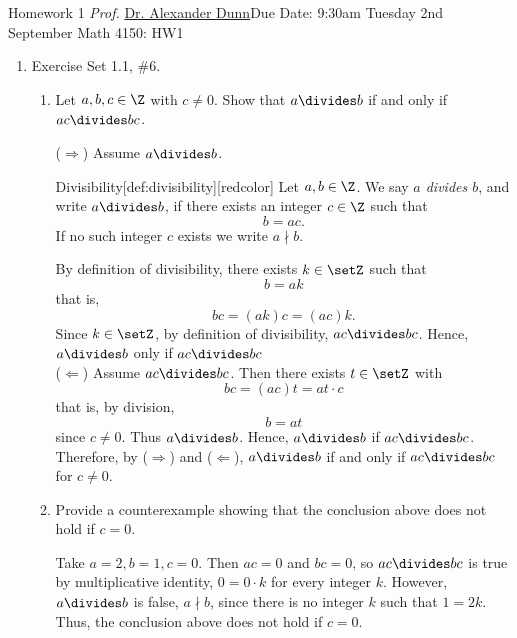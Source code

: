 
\newpage{}
{Homework 1}
{\textit{Prof.} \href{https://alexjdunn.weebly.com/}{Dr. Alexander Dunn}}{Due Date: 9:30am Tuesday 2nd September}
{Math 4150: HW1}


\newpage


\begin{enumerate}
  \item Exercise Set 1.1, \#6.
  \begin{enumerate}
    \item Let $a,b, c\in \Z$ with $c\neq 0$. Show that $a\divides b$ if and only if $ac \divides bc$.
    \begin{subprove}
      ($\Rightarrow$) Assume $a\divides b$. 
      \begin{define}{Divisibility}[def:divisibility][redcolor]
      Let $a,b\in\Z$. We say \emph{$a$ divides $b$}, and write $a\divides b$, if there exists an 
      integer $c\in\Z$ such that
      \[
      b = a c.
      \]
      If no such integer $c$ exists we write $a\nmid b$.
      \end{define}
      By definition of divisibility, there exists $k\in\setZ$ such that
      \[
        b = a k
      \]
      that is,
      \[
        bc = (a k)c = (ac)k.
      \]
      Since $k\in\setZ$, by definition of divisibility, $ac\divides bc$. 
      Hence, $a\divides b$ only if $ac \divides bc$\vspace*{10px}\\
      ($\Leftarrow$) Assume $ac\divides bc$. Then there exists $t\in\setZ$ with
      \[
        bc = (ac)t = at\cdot c
      \]
      that is, by division,
      \[
        b = a t
      \]
      since $c\neq 0$.
      Thus $a\divides b$. Hence, $a\divides b$ if $ac \divides bc$.\vspace*{10px}\\
      Therefore, by ($\Rightarrow$) and ($\Leftarrow$), $a\divides b$ if and only if $ac \divides bc$ for $c\neq 0$.
    \end{subprove}

    \item Provide a counterexample showing that the conclusion above does not hold if $c = 0$.
    \begin{subanswer}
      Take $a=2, b=1, c=0$. Then $ac = 0$ and $bc=0$, so $ac\divides bc$ is true by 
      multiplicative identity, $0=0\cdot k$ for every integer $k$.
      However,  $a\divides b$ is false, $a\nmid b$, since there is no integer $k$ such that $1=2k$. 
      Thus, the conclusion above does not hold if $c = 0$.
    \end{subanswer}
  \end{enumerate}


\end{enumerate}

